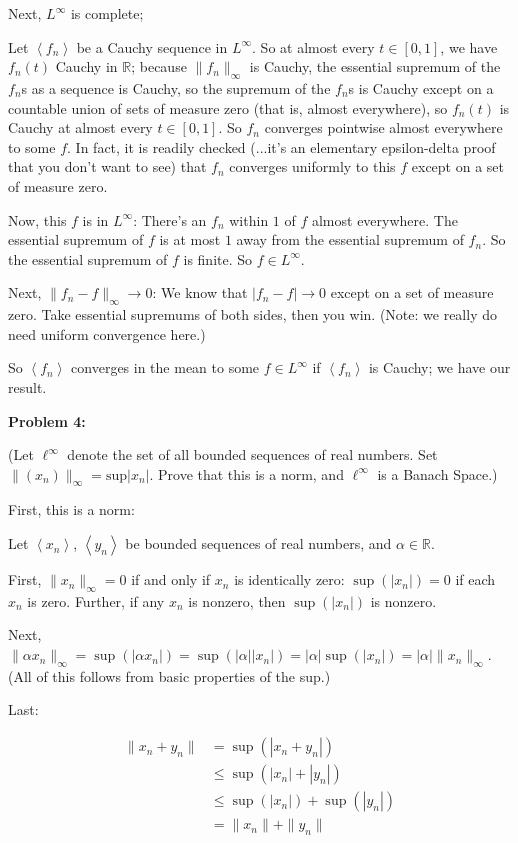 \documentclass[a4paper,12pt]{article}
\newcommand{\tab}{\hspace{4mm}} %
\newcommand{\shunt}{\vspace{20mm}}
\newcommand{\absval}[1]{\left\lvert #1 \right\rvert}
\newcommand{\norm}[1]{\|#1\|}
\newcommand{\anbrack}[1]{\left\langle #1 \right\rangle}
\newcommand{\al}{\alpha} %
\newcommand{\R}{\mathbb{R}}
\begin{document}
Next, $L^\infty$ is complete;

\tab Let $\anbrack{f_n}$ be a Cauchy sequence in $L^\infty$. So at almost every $t \in [0,1]$, we have $f_n(t)$ Cauchy in $\R$; because $\norm{f_n}_\infty$ is Cauchy, the essential supremum of the $f_n$s as a sequence is Cauchy, so the supremum of the $f_n$s is Cauchy except on a countable union of sets of measure zero (that is, almost everywhere), so $f_n(t)$ is Cauchy at almost every $t \in [0,1]$. So $f_n$ converges pointwise almost everywhere to some $f$. In fact, it is readily checked (...it's an elementary epsilon-delta proof that you don't want to see) that $f_n$ converges uniformly to this $f$ except on a set of measure zero.

\tab Now, this $f$ is in $L^\infty$: There's an $f_n$ within $1$ of $f$ almost everywhere. The essential supremum of $f$ is at most $1$ away from the essential supremum of $f_n$. So the essential supremum of $f$ is finite. So $f \in L^\infty$.

\tab Next, $\norm{f_n - f}_\infty \to 0$: We know that $\absval{f_n-f} \to 0$ except on a set of measure zero. Take essential supremums of both sides, then you win. (Note: we really do need uniform convergence here.)

\tab So $\anbrack{f_n}$ converges in the mean to some $f \in L^\infty$ if $\anbrack{f_n}$ is Cauchy; we have our result.

\shunt

{\bf Problem 4:} 

(Let $\ell^\infty$ denote the set of all bounded sequences of real numbers. Set $\norm{(x_n)}_\infty = \text{sup}\absval{x_n}$. Prove that this is a norm, and $\ell^\infty$ is a Banach Space.)

First, this is a norm:

Let $\anbrack{x_n}$, $\anbrack{y_n}$ be bounded sequences of real numbers, and $\al \in \R$.

\tab First, $\norm{x_n}_\infty = 0$ if and only if $x_n$ is identically zero: $\sup(\absval{x_n}) = 0$ if each $x_n$ is zero. Further, if any $x_n$ is nonzero, then $\sup(\absval{x_n})$ is nonzero.

\tab Next, $\norm{\al x_n}_\infty = \sup(\absval{\al x_n}) = \sup(\absval{\al}\absval{x_n}) = \absval{\al}\sup(\absval{x_n}) = \absval{\al}\norm{x_n}_\infty$. (All of this follows from basic properties of the sup.)

\tab Last:

\begin{align*}
\norm{x_n+y_n} &= \sup(\absval{x_n+y_n})\\
&\leq \sup(\absval{x_n}+\absval{y_n})\\
&\leq \sup(\absval{x_n})+\sup(\absval{y_n})\\
&=\norm{x_n}+\norm{y_n}
\end{align*}
\end{document}
